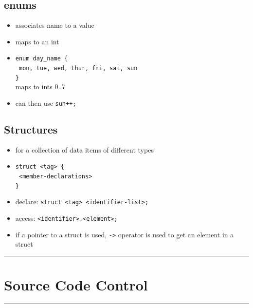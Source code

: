 \documentclass[10pt, multicolumn, a4paper]{article}
\begin{document}
\begin{multicols}{2}
	\subsection*{enums}
	\begin{itemize}
	\item associates name to a value
	\item maps to an int
	\item \verb|enum day_name {| \\ \texttt{\hspace*{5mm} mon, tue, wed, thur, fri, sat, sun} \\ \verb|}|
		\\ maps to ints 0..7
	\item can then use \verb|sun++;|
	\end{itemize}
	\subsection*{Structures}
	\begin{itemize}
	\item for a collection of data items of different types
	\item \verb|struct <tag> {|	\\ \texttt{\hspace*{5mm} <member-declarations>} \\ \verb|}|
	\item declare: \verb|struct <tag> <identifier-list>;|
	\item access: \verb|<identifier>.<element>;|
	\item if a pointer to a struct is used, \verb|->| operator is used to get an element in a struct
	\end{itemize}
\end{multicols}


\hrule
\section{Source Code Control}
\hrule 
\end{document}
